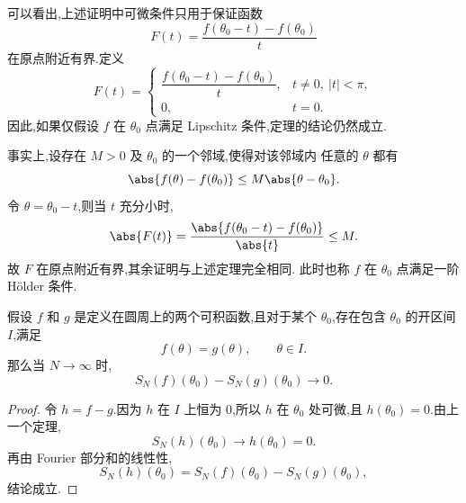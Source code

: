 可以看出,上述证明中可微条件只用于保证函数
\[
F(t)=\frac{f(\theta_0-t)-f(\theta_0)}{t}
\]
在原点附近有界.定义
\[
F(t)=
\begin{cases}
	\dfrac{f(\theta_0-t)-f(\theta_0)}{t},
	& t\neq 0,\ |t|<\pi,\\[6pt]
	0,  & t=0.
\end{cases}
\]
因此,如果仅假设 $f$ 在 $\theta_0$ 点满足
Lipschitz 条件,定理的结论仍然成立.

事实上,设存在 $M>0$ 及 $\theta_0$ 的一个邻域,使得对该邻域内
任意的 $\theta$ 都有
\[
\abs{f(\theta)-f(\theta_0)}
\leq M\abs{\theta-\theta_0}.
\]
令 $\theta=\theta_0-t$,则当 $t$ 充分小时,
\[
\abs{F(t)}
=
\frac{\abs{f(\theta_0-t)-f(\theta_0)}}{\abs{t}}
\leq M.
\]
故 $F$ 在原点附近有界,其余证明与上述定理完全相同.
此时也称 $f$ 在 $\theta_0$ 点满足一阶 H\"older 条件.

\begin{corollary}
	假设 $f$ 和 $g$ 是定义在圆周上的两个可积函数,且对于某个 $\theta_0$,存在包含 $\theta_0$ 的开区间 $I$,满足
	\[
	f(\theta)=g(\theta),
	\qquad \theta\in I.
	\]
	那么当 $N\to\infty$ 时,
	\[
	S_N(f)(\theta_0)-S_N(g)(\theta_0)\longrightarrow0.
	\]
\end{corollary}

\begin{proof}
	令 $h=f-g$.因为 $h$ 在 $I$ 上恒为 $0$,所以 $h$ 在 $\theta_0$ 处可微,且 $h(\theta_0)=0$.由上一个定理,
	\[
	S_N(h)(\theta_0)\longrightarrow h(\theta_0)=0.
	\]
	再由 Fourier 部分和的线性性,
	\[
	S_N(h)(\theta_0)
	=S_N(f)(\theta_0)-S_N(g)(\theta_0),
	\]
	结论成立.
\end{proof}

